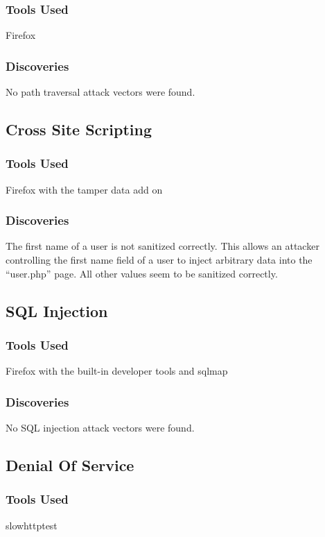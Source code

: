 \documentclass{article}
\begin{document}
\subsubsection*{Tools Used}
Firefox

\subsubsection*{Discoveries}
No path traversal attack vectors were found.

\subsection{Cross Site Scripting }
\subsubsection*{Tools Used}
Firefox with the tamper data add on

\subsubsection*{Discoveries}
The first name of a user is not sanitized correctly. This allows an attacker controlling the first name field of a user to inject arbitrary data into the ``user.php'' page. All other values seem to be sanitized correctly.

\subsection{SQL Injection}
\subsubsection*{Tools Used}
Firefox with the built-in developer tools and sqlmap

\subsubsection*{Discoveries}
No SQL injection attack vectors were found.

\subsection{Denial Of Service}
\subsubsection*{Tools Used}
slowhttptest
\end{document}
